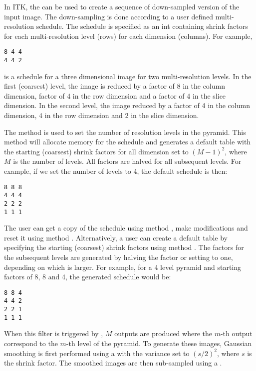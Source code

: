 

In ITK, the  can be used to create a
sequence of down-sampled version of the input image.  The down-sampling is done
according to a user defined multi-resolution schedule. The schedule is
specified as an \<int\> containing shrink factors for each
multi-resolution level (rows) for each dimension (columns). For example,

\begin{verbatim}
8 4 4
4 4 2
\end{verbatim}

is a schedule for a three dimensional image for two multi-resolution levels. 
In the first (coarsest) level, the image is reduced by a factor of 8 
in the column dimension, factor of 4 in the row dimension and a factor
of 4 in the slice dimension. In the second level, the image reduced
by a factor of 4 in the column dimension, 4 in the row dimension and
2 in the slice dimension.


The method  is used to set the number of
resolution levels in the pyramid. This method will allocate memory
for the schedule and generates a default table with the starting
(coarsest) shrink factors for all dimension set to $(M-1)^2$, 
where $M$ is the number of levels. All factors are halved for
all subsequent levels. For example, if we set the number of levels
to 4, the default schedule is then:

\begin{verbatim}
8 8 8
4 4 4
2 2 2
1 1 1
\end{verbatim}


The user can get a copy of the schedule using method ,
make modifications and reset it using method .
Alternatively, a user can create a default table by specifying the
starting (coarsest) shrink factors using method 
. The factors for the subsequent
levels are generated by halving the factor or setting to one, 
depending on which is larger. For example, for a 4 level pyramid
and starting factors of 8, 8 and 4, the generated schedule would be:

\begin{verbatim}
8 8 4
4 4 2
2 2 1
1 1 1
\end{verbatim}

When this filter is triggered by , $M$ outputs are produced
where the $m$-th output correspond to the $m$-th level of the pyramid.
To generate these images, Gaussian smoothing is first performed using a
 with the variance set to $(s/2)^2$,
where $s$ is the shrink factor. The smoothed images are then sub-sampled using
a .
